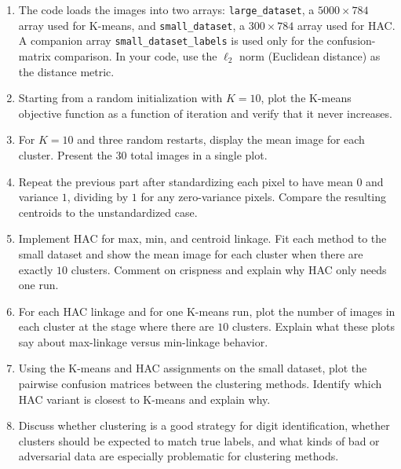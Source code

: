 \documentclass[submit]{../harvardml}
\begin{document}
\begin{problem}
\begin{enumerate}[leftmargin=*]
    \item The code loads the images into two arrays: \texttt{large\_dataset}, a \(5000 \times 784\) array used for K-means, and \texttt{small\_dataset}, a \(300 \times 784\) array used for HAC. A companion array \texttt{small\_dataset\_labels} is used only for the confusion-matrix comparison. In your code, use the \(\ell_2\) norm (Euclidean distance) as the distance metric.
    \item Starting from a random initialization with \(K=10\), plot the K-means objective function as a function of iteration and verify that it never increases.
    \item For \(K=10\) and three random restarts, display the mean image for each cluster. Present the \(30\) total images in a single plot.
    \item Repeat the previous part after standardizing each pixel to have mean \(0\) and variance \(1\), dividing by \(1\) for any zero-variance pixels. Compare the resulting centroids to the unstandardized case.
    \item Implement HAC for max, min, and centroid linkage. Fit each method to the small dataset and show the mean image for each cluster when there are exactly \(10\) clusters. Comment on crispness and explain why HAC only needs one run.
    \item For each HAC linkage and for one K-means run, plot the number of images in each cluster at the stage where there are \(10\) clusters. Explain what these plots say about max-linkage versus min-linkage behavior.
    \item Using the K-means and HAC assignments on the small dataset, plot the pairwise confusion matrices between the clustering methods. Identify which HAC variant is closest to K-means and explain why.
    \item Discuss whether clustering is a good strategy for digit identification, whether clusters should be expected to match true labels, and what kinds of bad or adversarial data are especially problematic for clustering methods.
\end{enumerate}
\end{problem}

\newpage
\end{document}
